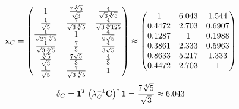 \documentclass[10pt,a4paper]{article}
\begin{document}
	\[
		\bold{x}_{C} = 
		\begin{pmatrix}
			{1} {} & \frac{{7}\sqrt[4]{5}} {\sqrt{3}} & \frac{{4}} {\sqrt{3}\sqrt[4]{5}} \\
			\frac{1} {\sqrt{5}} & \frac{{7}} {\sqrt{3}\sqrt[4]{5}} & \frac{{4}} {\sqrt{3}\sqrt[4]{125}} \\
			\frac{1} {\sqrt{27}\sqrt[4]{5}} & {1} {} & \frac{{4}} {{9}\sqrt{5}} \\
			\frac{1} {\sqrt{3}\sqrt[4]{5}} & \frac{{7}} {{3}} & \frac{{4}} {{3}\sqrt{5}} \\
			\frac{\sqrt[4]{5}} {\sqrt{3}} & \frac{{7}\sqrt{5}} {{3}} & \frac{{4}} {{3}} \\
			\frac{1} {\sqrt{5}} & \frac{{7}} {\sqrt{3}\sqrt[4]{5}} & {1} {} \\
		\end{pmatrix}
		\approx
		\begin{pmatrix}
			1        & 6.043    & 1.544    \\
			0.4472   & 2.703    & 0.6907   \\
			0.1287   & 1        & 0.1988   \\
			0.3861   & 2.333    & 0.5963   \\
			0.8633   & 5.217    & 1.333    \\
			0.4472   & 2.703    & 1        \\
		\end{pmatrix}
	\]
	\[
		\delta_{C} = \bold{1}^T \left(\lambda_{C}^{-1}\bold{C}\right)^* \bold{1} = \frac{{7}\sqrt[4]{5}} {\sqrt{3}}\approx 6.043
	\]
\end{document}
